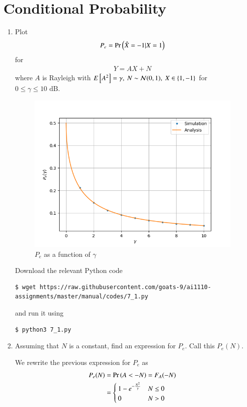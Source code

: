 \documentclass[journal,12pt,twocolumn]{IEEEtran}
\renewcommand\thesection{\arabic{section}}
\begin{document}
\section{Conditional Probability}
\begin{enumerate}[label=\thesection.\arabic*
,ref=\thesection.\theenumi]
\item Plot 
	\begin{align}
		P_e = \Pr\left(\hat{X} = -1|X = 1\right)
	\end{align}
for 
	\begin{align}
		Y = AX + N
	\end{align}
where $A$ is Rayleigh with $E{}\left[A^2\right] = \gamma,\ N \sim \mathcal{N}(0, 1),\ X \in \left\{1, -1\right\}$ for $0 \leq \gamma \leq 10 \text{ dB}$.

\solution
		\begin{figure}
			\includegraphics[width=\columnwidth]{figs/7_1.png}
			\caption{$P_e$ as a function of $\gamma$}
			\label{fig:err-gamma}
		\end{figure}
Download the relevant Python code
\begin{lstlisting}
$ wget https://raw.githubusercontent.com/goats-9/ai1110-assignments/master/manual/codes/7_1.py
\end{lstlisting}
and run it using
\begin{lstlisting}
$ python3 7_1.py
\end{lstlisting}

\item Assuming that $N$ is a constant, find an expression for $P_e$. Call this $P_e(N)$.

\solution
We rewrite the previous expression for $P_e$ as
\begin{align}
	P_e(N) &= \Pr\left(A < -N\right) = F_A(-N) \\
	&= 
	\begin{cases}
		1 - e^{-\frac{N^2}{\gamma}} & N \leq 0 \\
		0 & N > 0
	\end{cases}
\end{align}


\end{enumerate}
\end{document}
